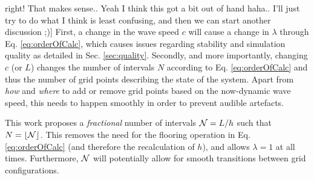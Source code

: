 \documentclass[fleqn]{jaes}
\begin{document}
right! That makes sense.. Yeah I think this got a bit out of hand haha.. I'll just try to do what I think is least confusing, and then we can start another discussion ;)] 
%
First, a change in the wave speed $c$ will cause a change in $\lambda$ through Eq. \eqref{eq:orderOfCalc}, which causes issues regarding stability and simulation quality as detailed in Sec. \ref{sec:quality}. Secondly, and more importantly, changing $c$ (or $L$) changes the number of intervals $N$ according to Eq. \eqref{eq:orderOfCalc} and thus the number of grid points describing the state of the system. Apart from \textit{how} and \textit{where} to add or remove grid points based on the now-dynamic wave speed, this needs to happen smoothly in order to prevent audible artefacts. %

This work proposes a \textit{fractional} number of intervals $\mathcal{N} = L / h$ such that $N = \floor[\Nfrac]$. This removes the need for the flooring operation in Eq. \eqref{eq:orderOfCalc} (and therefore the recalculation of $h$), and allows $\lambda = 1$ at all times. Furthermore, $\mathcal{N}$ will potentially allow for smooth transitions between grid configurations. 
\end{document}
